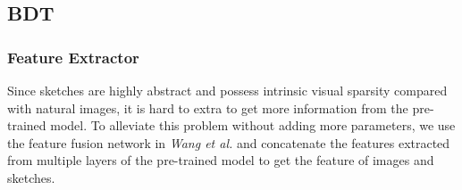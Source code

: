 \documentclass[10pt,twocolumn,letterpaper]{article}
\begin{document}

\subsection{BDT} \label{3.2}

\subsubsection{Feature Extractor} 
Since sketches are highly abstract and possess intrinsic visual sparsity compared with natural images, it is hard to extra to get more information from the pre-trained model. To alleviate this problem without adding more parameters, we use the feature fusion network in \textit{Wang et al.} \cite{wang2019stacked} and concatenate the features extracted from multiple layers of the pre-trained model to get the feature of images and sketches.
\end{document}
